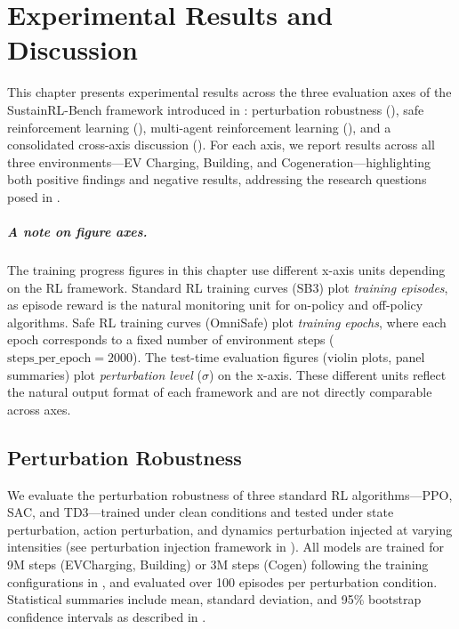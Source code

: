 \chapter{Experimental Results and Discussion}
\label{ch:results}


This chapter presents experimental results across the three evaluation axes of the SustainRL-Bench framework introduced in : perturbation robustness (), safe reinforcement learning (), multi-agent reinforcement learning (), and a consolidated cross-axis discussion (). For each axis, we report results across all three environments---EV Charging, Building, and Cogeneration---highlighting both positive findings and negative results, addressing the research questions posed in .

\paragraph{A note on figure axes.} The training progress figures in this chapter use different x-axis units depending on the RL framework. Standard RL training curves (SB3) plot \emph{training episodes}, as episode reward is the natural monitoring unit for on-policy and off-policy algorithms. Safe RL training curves (OmniSafe) plot \emph{training epochs}, where each epoch corresponds to a fixed number of environment steps ($\text{steps\_per\_epoch} = 2000$). The test-time evaluation figures (violin plots, panel summaries) plot \emph{perturbation level} ($\sigma$) on the x-axis. These different units reflect the natural output format of each framework and are not directly comparable across axes.

\section{Perturbation Robustness}
\label{sec:results_noise}

We evaluate the perturbation robustness of three standard RL algorithms---PPO, SAC, and TD3---trained under clean conditions and tested under state perturbation, action perturbation, and dynamics perturbation injected at varying intensities (see perturbation injection framework in ). All models are trained for 9M steps (EVCharging, Building) or 3M steps (Cogen) following the training configurations in , and evaluated over 100 episodes per perturbation condition. Statistical summaries include mean, standard deviation, and 95\% bootstrap confidence intervals as described in .

